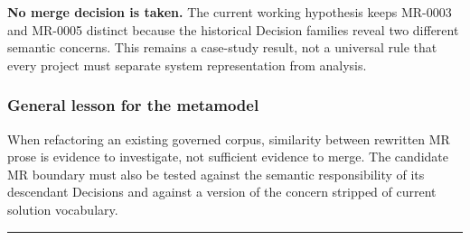 \documentclass[
  10pt,
]{article}
\begin{document}
\textbf{No merge decision is taken.} The current working hypothesis
keeps MR-0003 and MR-0005 distinct because the historical Decision
families reveal two different semantic concerns. This remains a
case-study result, not a universal rule that every project must separate
system representation from analysis.

\subsubsection{General lesson for the
metamodel}\label{general-lesson-for-the-metamodel}

When refactoring an existing governed corpus, similarity between
rewritten MR prose is evidence to investigate, not sufficient evidence
to merge. The candidate MR boundary must also be tested against the
semantic responsibility of its descendant Decisions and against a
version of the concern stripped of current solution vocabulary.

\begin{center}\rule{0.5\linewidth}{0.5pt}\end{center}
\end{document}
